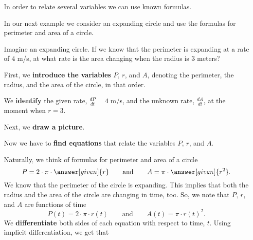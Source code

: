 \documentclass{ximera}
\begin{document}
In order to relate several variables we can use known formulas.

In our next example we consider an expanding circle and use the formulas for perimeter and area of a circle.

    \begin{image}
    \end{image}
\begin{example}
  Imagine an expanding circle. If we know that the perimeter is
  expanding at a rate of $4$ m/s, at what rate is the area changing
  when the radius is $3$ meters?
  \begin{explanation}
  
 

   First, we \textbf{introduce the variables} $P$, $r$, and $A$,  denoting the perimeter, the radius, and  the area of the circle, in that order. 
   
   We \textbf{identify} the given rate, $\frac{dP}{dt}=4$ m/s, and the unknown rate, $\frac{dA}{dt}$, at the moment when $r=3$. 
   
    Next, we \textbf{draw a picture}.
    \begin{image}
    \end{image}
   Now we have to \textbf{find equations} that relate
   the variables $P$, $r$, and $A$. 
   
   Naturally, we think of formulas for perimeter and area of a circle
    \[
    P = 2\cdot \pi \cdot \answer[given]{r}
    \qquad\text{and}\qquad
    A = \pi \cdot \answer[given]{r^{2}}.
    \]
   We know that the perimeter of the circle is expanding. This implies that both the radius and the area of the circle are changing in time, too.
    So, we note that $P$, $r$, and $A$ are functions of time
    \[
    P(t) = 2\cdot \pi \cdot r(t)
    \qquad\text{and}\qquad
    A(t) = \pi \cdot r(t)^2.
    \]
    We \textbf{differentiate} both sides of each equation with respect to time, $t$.  Using implicit
    differentiation, we get that
    

\end{explanation}
\end{example}
\end{document}
